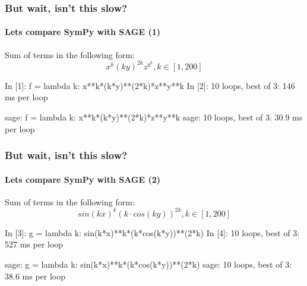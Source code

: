 \documentclass{beamer}
\begin{document}
\begin{frame}[fragile]
    \frametitle{But wait, isn't this slow?}
    \framesubtitle{Lets compare SymPy with SAGE (1)}

    Sum of terms in the following form:
    \begin{equation*}
    x^k (k y)^{2 k} z^{y^k}, k \in [1,200]
    \end{equation*}

    \begin{python}
In [1]: f = lambda k: x**k*(k*y)**(2*k)*z**y**k
In [2]: %
10 loops, best of 3: 146 ms per loop
    \end{python}

    \begin{python}
sage: f = lambda k: x**k*(k*y)**(2*k)*z**y**k
sage: %
10 loops, best of 3: 30.9 ms per loop
    \end{python}
\end{frame}

\begin{frame}[fragile]
    \frametitle{But wait, isn't this slow?}
    \framesubtitle{Lets compare SymPy with SAGE (2)}

    Sum of terms in the following form:
    \begin{equation*}
    sin(k x)^k (k \cdot cos(k y))^{2 k}, k \in [1,200]
    \end{equation*}

    \begin{python}
In [3]: g = lambda k: sin(k*x)**k*(k*cos(k*y))**(2*k)
In [4]: %
10 loops, best of 3: 527 ms per loop
    \end{python}

    \begin{python}
sage: g = lambda k: sin(k*x)**k*(k*cos(k*y))**(2*k)
sage: %
10 loops, best of 3: 38.6 ms per loop
    \end{python}
\end{frame}
\end{document}
